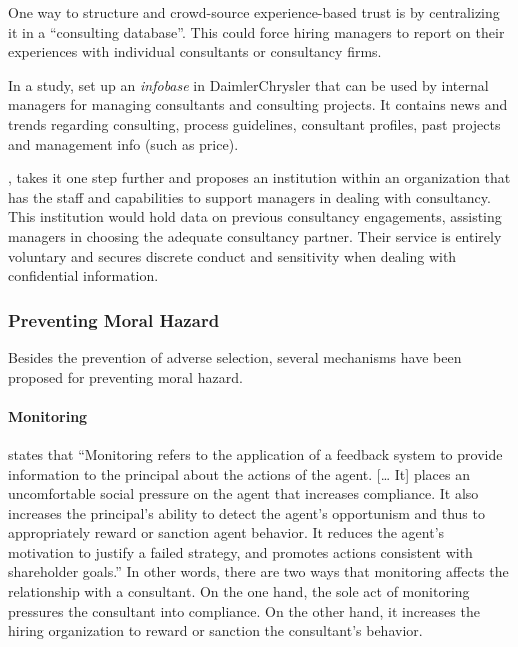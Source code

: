 \documentclass[12pt]{article}
\begin{document}
One way to structure and crowd-source experience-based trust is by
centralizing it in a ``consulting database''. This could force hiring
managers to report on their experiences with individual consultants or
consultancy firms.

In a study, \citet{mohe2006} set up an \emph{infobase} in
DaimlerChrysler that can be used by internal managers for managing
consultants and consulting projects. It contains news and trends
regarding consulting, process guidelines, consultant profiles, past
projects and management info (such as price).

\citet[308]{honer2006}, takes it one step further and proposes an
institution within an organization that has the staff and capabilities
to support managers in dealing with consultancy. This institution would
hold data on previous consultancy engagements, assisting managers in
choosing the adequate consultancy partner. Their service is entirely
voluntary and secures discrete conduct and sensitivity when dealing with
confidential information.

\subsubsection{Preventing Moral Hazard}\label{preventing-moral-hazard}

Besides the prevention of adverse selection, several mechanisms have
been proposed for preventing moral hazard.

\paragraph{Monitoring}\label{monitoring}

\citep[ 13]{basu2011} states that ``Monitoring refers to the application
of a feedback system to provide information to the principal about the
actions of the agent. {[}\ldots{} It{]} places an uncomfortable social
pressure on the agent that increases compliance. It also increases the
principal's ability to detect the agent's opportunism and thus to
appropriately reward or sanction agent behavior. It reduces the agent's
motivation to justify a failed strategy, and promotes actions consistent
with shareholder goals.'' In other words, there are two ways that
monitoring affects the relationship with a consultant. On the one hand,
the sole act of monitoring pressures the consultant into compliance. On
the other hand, it increases the hiring organization to reward or
sanction the consultant's behavior.
\end{document}
